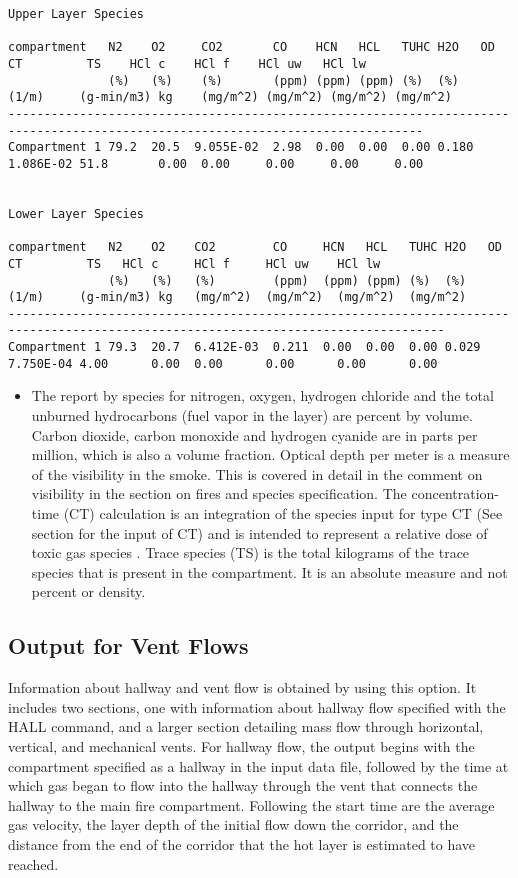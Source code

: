 \begin{lstlisting}[basicstyle=\tiny]
Upper Layer Species

compartment   N2    O2     CO2       CO    HCN   HCL   TUHC H2O   OD        CT         TS    HCl c    HCl f    HCl uw   HCl lw
              (%)   (%)    (%)       (ppm) (ppm) (ppm) (%)  (%)   (1/m)     (g-min/m3) kg    (mg/m^2) (mg/m^2) (mg/m^2) (mg/m^2)
--------------------------------------------------------------------------------------------------------------------------------
Compartment 1 79.2  20.5  9.055E-02  2.98  0.00  0.00  0.00 0.180 1.086E-02 51.8       0.00  0.00     0.00     0.00     0.00


Lower Layer Species

compartment   N2    O2    CO2        CO     HCN   HCL   TUHC H2O   OD        CT         TS   HCl c     HCl f     HCl uw    HCl lw
              (%)   (%)   (%)        (ppm)  (ppm) (ppm) (%)  (%)   (1/m)     (g-min/m3) kg   (mg/m^2)  (mg/m^2)  (mg/m^2)  (mg/m^2)
-----------------------------------------------------------------------------------------------------------------------------------
Compartment 1 79.3  20.7  6.412E-03  0.211  0.00  0.00  0.00 0.029 7.750E-04 4.00      0.00  0.00      0.00      0.00      0.00
\end{lstlisting}

\begin{itemize}
\item The report by species for nitrogen, oxygen, hydrogen chloride and the total unburned hydrocarbons (fuel vapor in the layer) are percent by volume. Carbon dioxide, carbon monoxide and hydrogen cyanide are in parts per million, which is also a volume fraction.  Optical depth per meter is a measure of the visibility in the smoke. This is covered in detail in the comment on visibility in the section on fires and species specification. The concentration-time (CT) calculation is an integration of the species input for type CT (See section  for the input of CT) and is intended to represent a relative dose of toxic gas species . Trace species (TS) is the total kilograms of the trace species that is present in the compartment. It is an absolute measure and not percent or density.
\end{itemize}

\subsection{Output for Vent Flows}

Information about hallway and vent flow is obtained by using this option.  It includes two sections, one with information about hallway flow specified with the HALL command, and a larger section detailing mass flow through horizontal, vertical, and mechanical vents.  For hallway flow, the output begins with the compartment specified as a hallway in the input data file, followed by the time at which gas began to flow into the hallway through the vent that connects the hallway to the main fire compartment. Following the start time are the average gas velocity, the layer depth of the initial flow down the corridor, and the distance from the end of the corridor that the hot layer is estimated to have reached.

